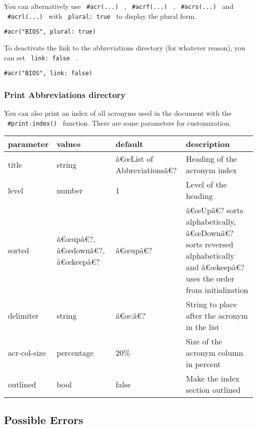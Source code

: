 You can alternatively use \texttt{\ \#acr(...)\ } ,
\texttt{\ \#acrf(...)\ } , \texttt{\ \#acrs(...)\ } and
\texttt{\ \#acrl(...)\ } with \texttt{\ plural:\ true\ } to display the
plural form.

\begin{verbatim}
#acr("BIOS", plural: true)
\end{verbatim}

To deactivate the link to the abbreviations directory (for whatever
reason), you can set \texttt{\ link:\ false\ } .

\begin{verbatim}
#acr("BIOS", link: false)
\end{verbatim}

\subsubsection{Print Abbreviations
directory}\label{print-abbreviations-directory}

You can also print an index of all acronyms used in the document with
the \texttt{\ \#print-index()\ } function. There are some parameters for
customization.

\begin{longtable}[]{@{}llll@{}}
\toprule\noalign{}
parameter & values & default & description \\
\midrule\noalign{}
\endhead
\bottomrule\noalign{}
\endlastfoot
title & string & â€œList of Abbreviationsâ€? & Heading of the acronym
index \\
level & number & 1 & Level of the heading \\
sorted & â€œupâ€?, â€œdownâ€?, â€œkeepâ€? & â€œupâ€? & â€œUpâ€? sorts
alphabetically, â€œDownâ€? sorts reversed alphabetically and â€œkeepâ€?
uses the order from initialization \\
delimiter & string & â€œ:â€? & String to place after the acronym in the
list \\
acr-col-size & percentage & 20\% & Size of the acronym column in
percent \\
outlined & bool & false & Make the index section outlined \\
\end{longtable}

\subsection{Possible Errors}\label{possible-errors}


